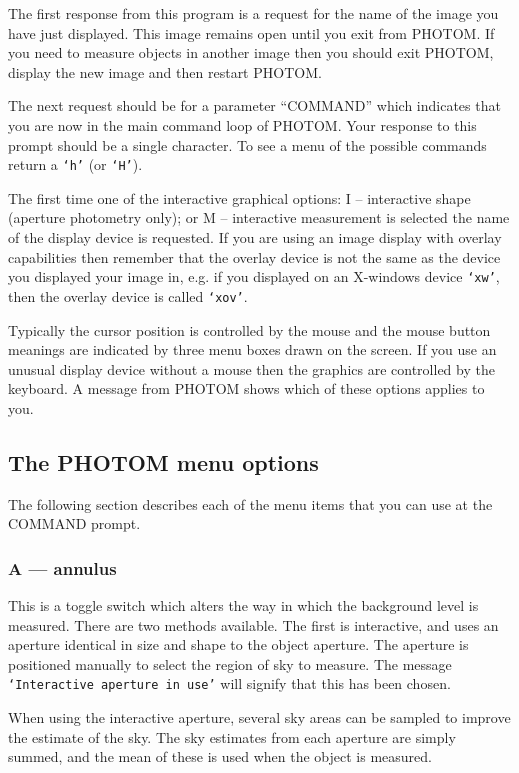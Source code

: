\documentclass[twoside,11pt]{article}
\newcommand{\xlabel}[1]{}
\renewcommand{\_}{\texttt{\symbol{95}}}
\newcommand{\st}[1]{\texttt{`#1'}}
\begin{document}
The first response from this program is a request for the name of the
image you have just displayed. This image remains open until you exit
from PHOTOM. If you need to measure objects in another image then you
should exit PHOTOM, display the new image and then restart PHOTOM.

The next request should be for a parameter ``COMMAND'' which indicates that
you are now in the main command loop of PHOTOM. Your response to this
prompt should be a single character. To see a menu of the possible
commands return a \st{h} (or \st{H}).

The first time one of the interactive graphical options: I --
interactive shape (aperture photometry only); or M -- interactive
measurement is selected the name of the display device is requested.
If you are using an image display with overlay capabilities then
remember that the overlay device is not the same as the device you
displayed your image in, e.g. if you displayed on an X-windows device
\st{xw}, then the overlay device is called \st{xov}.

Typically the cursor position is controlled by the mouse and the mouse
button meanings are indicated by three menu boxes drawn on the screen.
If you use an unusual display device without a mouse then the graphics
are controlled by the keyboard. A message from PHOTOM shows which of
these options applies to you.

\subsection{\xlabel{the_photom_menu_options}The PHOTOM menu options}
The following section describes each of the menu items that you can use
at the COMMAND prompt.

\subsubsection{A --- annulus}

This is a toggle switch which alters the way in which the background
level is measured. There are two methods available. The first is
interactive, and uses an aperture identical in size and shape to the
object aperture. The aperture is positioned manually to select the
region of sky to measure. The message \st{Interactive aperture in use}
will signify that this has been chosen.

When using the interactive aperture, several sky areas can be sampled
to improve the estimate of the sky. The sky estimates from each
aperture are simply summed, and the mean of these is used when the
object is measured.
\end{document}
